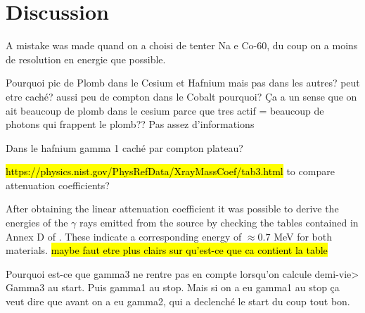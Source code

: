 \section{Discussion}
A mistake was made quand on a choisi de tenter Na e Co-60, du coup on a moins de resolution en energie que possible.

Pourquoi pic de Plomb dans le Cesium et Hafnium mais pas dans les autres?
peut etre caché? aussi peu de compton dans le Cobalt pourquoi?
Ça a un sense que on ait beaucoup de plomb dans le cesium parce que tres actif = beaucoup de photons qui frappent le plomb??
Pas assez d'informations

Dans le hafnium gamma 1 caché par compton plateau?


\hl{https://physics.nist.gov/PhysRefData/XrayMassCoef/tab3.html} to compare attenuation coefficients?

After obtaining the linear attenuation coefficient it was possible to derive the energies of the $\gamma$ rays emitted from the source by checking the tables contained in Annex D of \cite{notice_generale}.
These indicate a corresponding energy of $\approx 0.7$ MeV for both materials.
\hl{maybe faut etre plus clairs sur qu'est-ce que ca contient la table}

Pourquoi est-ce que gamma3 ne rentre pas en compte lorsqu'on calcule demi-vie>
Gamma3 au start. Puis gamma1 au stop. Mais si on a eu gamma1 au stop ça veut dire que avant on a eu gamma2, qui a declenché le start du coup tout bon.